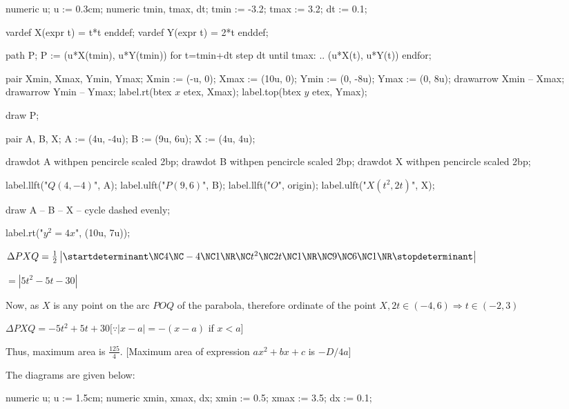   \startplacefigure[location=foce]
    \startMPcode
      numeric u; u := 0.3cm;
      numeric tmin, tmax, dt;
      tmin := -3.2; tmax := 3.2; dt := 0.1;

      vardef X(expr t) = t*t enddef;       %
      vardef Y(expr t) = 2*t enddef;       %

      path P;
      P := (u*X(tmin), u*Y(tmin))
      for t=tmin+dt step dt until tmax:
      .. (u*X(t), u*Y(t))
      endfor;

      pair Xmin, Xmax, Ymin, Ymax;
      Xmin := (-u, 0);  Xmax := (10u, 0);
      Ymin := (0, -8u); Ymax := (0, 8u);
      drawarrow Xmin -- Xmax;
      drawarrow Ymin -- Ymax;
      label.rt(btex $x$ etex, Xmax);
      label.top(btex $y$ etex, Ymax);

      draw P;

      pair A, B, X;
      A := (4u, -4u);
      B := (9u, 6u);
      X := (4u, 4u);

      drawdot A withpen pencircle scaled 2bp;
      drawdot B withpen pencircle scaled 2bp;
      drawdot X withpen pencircle scaled 2bp;

      label.llft("$Q(4,-4)$", A);
      label.ulft("$P(9, 6)$", B);
      label.llft("$O$", origin);
      label.ulft("$X(t^2, 2t)$", X);

      draw A -- B -- X -- cycle dashed evenly;

      label.rt("$y^2=4x$", (10u, 7u));
    \stopMPcode
  \stopplacefigure

  $\Delta PXQ = \frac{1}{2}\left|\startdeterminant\NC 4\NC -4\NC 1\NR\NC t^2\NC 2t\NC 1\NR\NC 9\NC 6\NC
  1\NR\stopdeterminant\right|$

  $= \left|5t^2 - 5t - 30\right|$

  Now, as $X$ is any point on the arc $POQ$ of the parabola, therefore ordinate of the point $X, 2t\in(-4,
  6)\Rightarrow t\in(-2, 3)$

  $\Delta PXQ = -5t^2 + 5t + 30[\because |x - a| = -(x - a)$ if $x < a]$

  Thus, maximum area is $\frac{125}{4}$. [Maximum area of expression $ax^2 + bx + c$ is $-D/4a$]
\item The diagrams are given below:

  \startplacefigure[location=force]
    \startMPcode
      numeric u; u := 1.5cm;     %
      numeric xmin, xmax, dx;
      xmin := 0.5; xmax := 3.5; dx := 0.1;

